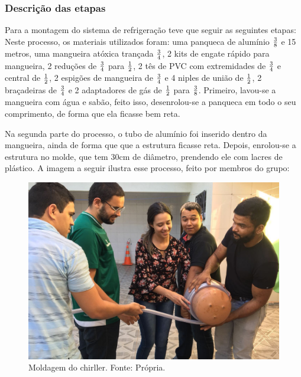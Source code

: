                 \subsubsection[Descrição das etapas]{Descrição das etapas}
                    Para a montagem do sistema de refrigeração teve que seguir as seguintes etapas:                    
                        Neste processo, os materiais utilizados foram: uma panqueca de alumínio $3 \over 8$ e
                        15 metros, uma mangueira atóxica trançada $3 \over 4$, 2 kits de engate rápido para
                        mangueira, 2  reduções de $3 \over 4$ para $1 \over 2$, 2 tês de PVC com extremidades de $3 \over 4$
                        e central de $1 \over 2$, 2 espigões de mangueira de $3 \over 4$ e 4 niples de união de $1 \over 2$,
                        2 braçadeiras de $3 \over 4$ e 2 adaptadores de gás de $1 \over 2$ para $3 \over 8$.
                        Primeiro, lavou-se a mangueira com água e sabão, feito isso,
                        desenrolou-se a panqueca em todo o seu comprimento, de forma que ela
                        ficasse bem reta. 
                        
                        Na segunda parte do processo, o tubo de alumínio foi inserido dentro da
                        mangueira, ainda de forma que que a estrutura ficasse reta. Depois,
                        enrolou-se a estrutura no molde, que tem 30cm de diâmetro, prendendo
                        ele com lacres de plástico. A imagem a seguir ilustra esse processo,
                        feito por membros do grupo:

                        \begin{figure}[!htb]
                            \centering
                            \includegraphics[scale= 0.3]{figuras/moldagem-chiller.png}
                            \caption{Moldagem do chirller. Fonte: Própria.}
                            \label{moldagem-chiller}
                        \end{figure}

